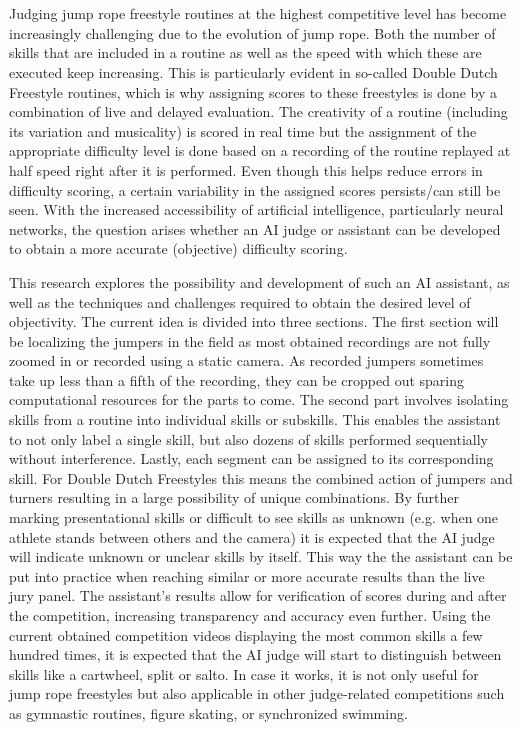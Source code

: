 
\chapter*{}

Judging jump rope freestyle routines at the highest competitive level has become increasingly challenging due to the evolution of jump rope. Both the number of skills that are included in a routine as well as the speed with which these are executed keep increasing. This is particularly evident in so-called Double Dutch Freestyle routines, which is why assigning scores to these freestyles is done by a combination of live and delayed evaluation. The creativity of a routine (including its variation and musicality) is scored in real time but the assignment of the appropriate difficulty level is done based on a recording of the routine replayed at half speed right after it is performed. Even though this helps reduce errors in difficulty scoring, a certain variability in the assigned scores persists/can still be seen. With the increased accessibility of artificial intelligence, particularly neural networks, the question arises whether an AI judge or assistant can be developed to obtain a more accurate (objective) difficulty scoring.

This research explores the possibility and development of such an AI assistant, as well as the techniques and challenges required to obtain the desired level of objectivity.
The current idea is divided into three sections. The first section will be localizing the jumpers in the field as most obtained recordings are not fully zoomed in or recorded using a static camera. As recorded jumpers sometimes take up less than a fifth of the recording, they can be cropped out sparing computational resources for the parts to come. The second part involves isolating skills from a routine into individual skills or subskills. This enables the assistant to not only label a single skill, but also dozens of skills performed sequentially without interference. Lastly, each segment can be assigned to its corresponding skill. For Double Dutch Freestyles this means the combined action of jumpers and turners resulting in a large possibility of unique combinations. By further marking presentational skills or difficult to see skills as unknown (e.g. when one athlete stands between others and the camera) it is expected that the AI judge will indicate unknown or unclear skills by itself. This way the the assistant can be put into practice when reaching similar or more accurate results than the live jury panel. The assistant's results allow for verification of scores during and after the competition, increasing transparency and accuracy even further. Using the current obtained competition videos displaying the most common skills a few hundred times, it is expected that the AI judge will start to distinguish between skills like a cartwheel, split or salto.
In case it works, it is not only useful for jump rope freestyles but also applicable in other judge-related competitions such as gymnastic routines, figure skating, or synchronized swimming.
